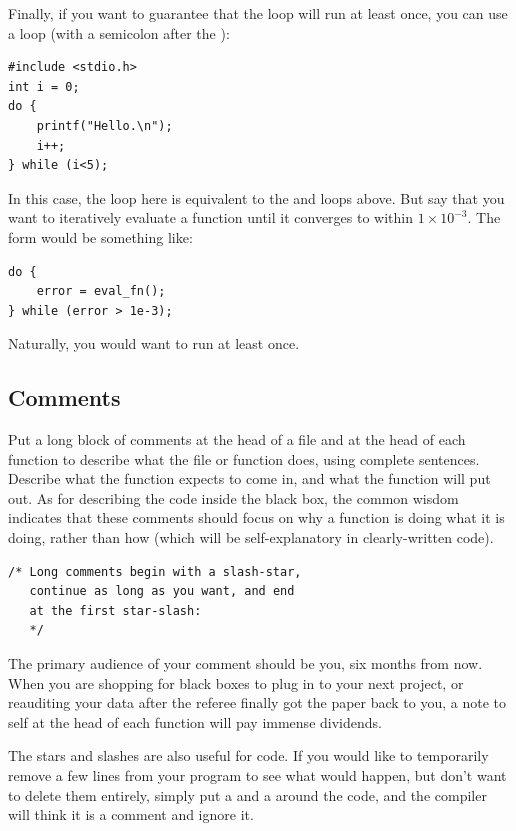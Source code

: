 Finally, if you want to guarantee that the loop will run at least once, you can use a  loop (with a semicolon after the ):

\begin{lstlisting}
#include <stdio.h>
int i = 0;
do {
    printf("Hello.\n");
    i++;
} while (i<5);
\end{lstlisting}
In this case, the  loop here is equivalent to the
 and  loops above. But say that you want to
iteratively evaluate a function until it converges to within $1\times
10^{-3}$.  The form would be something like:
\begin{lstlisting}
do {
    error = eval_fn();
} while (error > 1e-3);
\end{lstlisting}
Naturally, you would want to run  at least once.

\subsection{Comments} 
Put a long block of comments 
at the head of a file and at the head of each function to describe what
the file or function does, using complete sentences. Describe what the
function expects to come in, and what the function will put out.
As for describing the code inside the black box, the common wisdom
indicates that these comments should focus on why a function is doing what it is doing,
rather than how (which will be self-explanatory in clearly-written code).
\begin{verbatim}
/* Long comments begin with a slash-star,
   continue as long as you want, and end 
   at the first star-slash:   
   */
\end{verbatim}

The primary audience of your comment should be you, six months from
now. When you are shopping for black boxes to plug in to your next project,
or reauditing your data after the referee finally got the paper back
to you, a note to self at the head of each function will pay immense
dividends. 


The stars and slashes are also useful for  code. If
you would like to temporarily remove a few lines from your program to
see what would happen, but don't want to delete them entirely, simply
put a \ci{/*} and a \ci{*/} around the code, and the compiler will think
it is a comment and ignore it.

